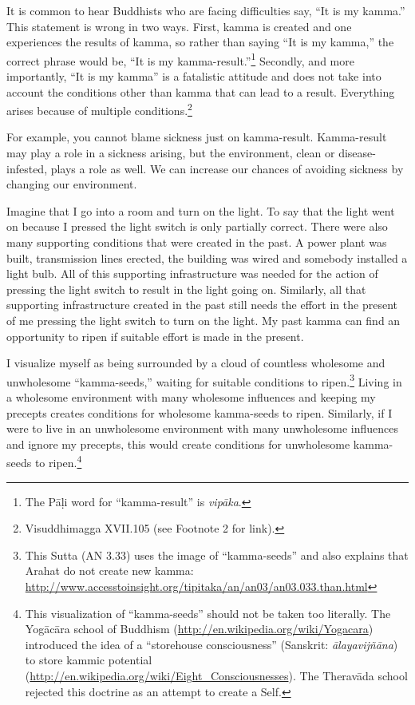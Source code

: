 It is common to hear Buddhists who are facing difficulties say, “It is my kamma.” This statement is wrong in two ways. First, kamma is created and one experiences the results of kamma, so rather than saying “It is my kamma,” the correct phrase would be, “It is my kamma-result.”\footnote{The Pāḷi word for “kamma-result” is \textit{vipāka}.} Secondly, and more importantly, “It is my kamma” is a fatalistic attitude and does not take into account the conditions other than kamma that can lead to a result. Everything arises because of multiple conditions.\footnote{Visuddhimagga XVII.105 (see Footnote 2 for link).} 

\pagebreak

For example, you cannot blame sickness just on kamma-result. Kamma-result may play a role in a sickness arising, but the environment, clean or disease-infested, plays a role as well. We can increase our chances of avoiding sickness by changing our environment.

Imagine that I go into a room and turn on the light. To say that the light went on because I pressed the light switch is only partially correct. There were also many supporting conditions that were created in the past. A power plant was built, transmission lines erected, the building was wired and somebody installed a light bulb. All of this supporting infrastructure was needed for the action of pressing the light switch to result in the light going on. Similarly, all that supporting infrastructure created in the past still needs the effort in the present of me pressing the light switch to turn on the light. My past kamma can find an opportunity to ripen if suitable effort is made in the present.

I visualize myself as being surrounded by a cloud of countless wholesome and unwholesome “kamma-seeds,” waiting for suitable conditions to ripen.\footnote{This Sutta (AN 3.33) uses the image of “kamma-seeds” and also explains that Arahat do not create new kamma: \url{http://www.accesstoinsight.org/tipitaka/an/an03/an03.033.than.html}} Living in a wholesome environment with many wholesome influences and keeping my precepts creates conditions for wholesome kamma-seeds to ripen. Similarly, if I were to live in an unwholesome environment with many unwholesome influences and ignore my precepts, this would create conditions for unwholesome kamma-seeds to ripen.\footnote{This visualization of “kamma-seeds” should not be taken too literally. The Yogācāra school of Buddhism (\url{http://en.wikipedia.org/wiki/Yogacara}) introduced the idea of a “storehouse consciousness” (Sanskrit: \textit{ālayavijñāna}) to store kammic potential (\url{http://en.wikipedia.org/wiki/Eight_Consciousnesses}). The Theravāda school rejected this doctrine as an attempt to create a Self.}

